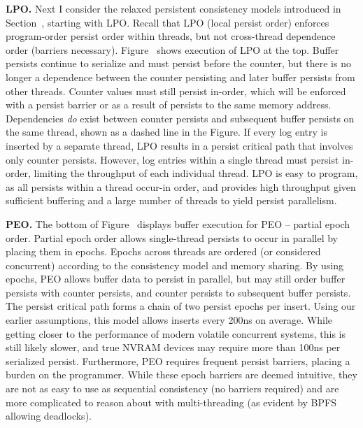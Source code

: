 \textbf{LPO.} Next I consider the relaxed persistent consistency models introduced in Section~, starting with LPO.
Recall that LPO (local persist order) enforces program-order persist order within threads, but not cross-thread dependence order (barriers necessary).
Figure~ shows execution of LPO at the top.
Buffer persists continue to serialize and must persist before the counter, but there is no longer a dependence between the counter persisting and later buffer persists from other threads.
Counter values must still persist in-order, which will be enforced with a persist barrier or as a result of persists to the same memory address.
Dependencies \emph{do} exist between counter persists and subsequent buffer persists on the same thread, shown as a dashed line in the Figure.
If every log entry is inserted by a separate thread, LPO results in a persist critical path that involves only counter persists.
However, log entries within a single thread must persist in-order, limiting the throughput of each individual thread.
LPO is easy to program, as all persists within a thread occur-in order, and provides high throughput given sufficient buffering and a large number of threads to yield persist parallelism.

\textbf{PEO.} The bottom of Figure~ displays buffer execution for PEO -- partial epoch order.
Partial epoch order allows single-thread persists to occur in parallel by placing them in epochs.
Epochs across threads are ordered (or considered concurrent) according to the consistency model and memory sharing.
By using epochs, PEO allows buffer data to persist in parallel, but may still order buffer persists with counter persists, and counter persists to subsequent buffer persists.
The persist critical path forms a chain of two persist epochs per insert.
Using our earlier assumptions, this model allows inserts every 200ns on average.
While getting closer to the performance of modern volatile concurrent systems, this is still likely slower, and true NVRAM devices may require more than 100ns per serialized persist.
Furthermore, PEO requires frequent persist barriers, placing a burden on the programmer.
While these epoch barriers are deemed intuitive, they are not as easy to use as sequential consistency (no barriers required) and are more complicated to reason about with multi-threading (as evident by BPFS allowing deadlocks).

